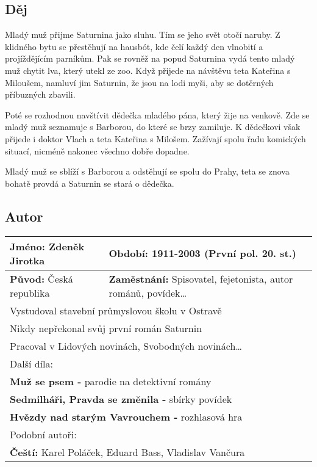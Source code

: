 \subsection*{Děj}
Mladý muž přijme Saturnina jako sluhu.
Tím se jeho svět otočí naruby.
Z klidného bytu se přestěhují na hausbót, kde čelí každý den vlnobití a projíždějícím parníkům.
Pak se rovněž na popud Saturnina vydá tento mladý muž chytit lva, který utekl ze zoo.
Když přijede na návštěvu teta Kateřina s Miloušem, namluví jim Saturnin, že jsou na lodi myši, aby se dotěrných příbuzných zbavili.

Poté se rozhodnou navštívit dědečka mladého pána, který žije na venkově.
Zde se mladý muž seznamuje s Barborou, do které se brzy zamiluje.
K dědečkovi však přijede i doktor Vlach a teta Kateřina s Milošem.
Zažívají spolu řadu komických situací, nicméně nakonec všechno dobře dopadne.

Mladý muž se sblíží s Barborou a odstěhují se spolu do Prahy, teta se znova bohatě provdá a Saturnin se stará o dědečka.

\subsection*{Autor}
\begin{tabularx}{\linewidth}{l|l}
  \textbf{Jméno:} Zdeněk Jirotka  & \textbf{Období:} 1911-2003 (První pol. 20. st.)                          \\
  \hline
  \textbf{Původ:} Česká republika & \textbf{Zaměstnání:} Spisovatel, fejetonista, autor románů, povídek\dots \\
  \hline
  \multicolumn{2}{l}{Vystudoval stavební průmyslovou školu v Ostravě}                                        \\
  \multicolumn{2}{l}{Nikdy nepřekonal svůj první román Saturnin}                                             \\
  \multicolumn{2}{l}{Pracoval v Lidových novinách, Svobodných novinách\dots}                                 \\
  \hline
  \multicolumn{2}{l}{Další díla:}                                                                            \\
  \multicolumn{2}{l}{\textbf{Muž se psem -} parodie na detektivní romány}                                    \\
  \multicolumn{2}{l}{\textbf{Sedmilháři, Pravda se změnila -} sbírky povídek}                                \\
  \multicolumn{2}{l}{\textbf{Hvězdy nad starým Vavrouchem -} rozhlasová hra}                                 \\
  \hline
  \multicolumn{2}{l}{Podobní autoři:}                                                                        \\
  \multicolumn{2}{l}{\textbf{Čeští:} Karel Poláček, Eduard Bass, Vladislav Vančura}                          \\
\end{tabularx}
